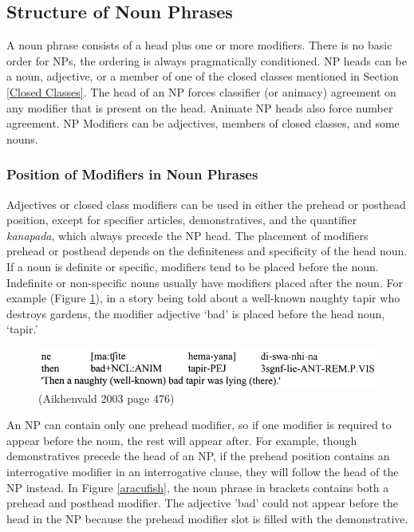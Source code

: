 \documentclass{article}
\begin{document}

\subsection{Structure of Noun Phrases}
A noun phrase consists of a head plus one or more modifiers. There is no basic order for NPs, the ordering is always pragmatically conditioned.
NP heads can be a noun, adjective, or a member of one of the closed classes mentioned in Section \ref*{Closed Classes}. The head of an NP forces classifier (or animacy) agreement on any modifier that is present on the head. Animate NP heads also force number agreement.
NP Modifiers can be adjectives, members of closed classes, and some nouns.

\subsubsection{Position of Modifiers in Noun Phrases}
 Adjectives or closed class modifiers can be used in either the prehead or posthead position, except for specifier articles, demonstratives, and the quantifier \textit{kanapada}, which always precede the NP head. The placement of modifiers prehead or posthead depends on the definiteness and specificity of the head noun. If a noun is definite or specific, modifiers tend to be placed before the noun. Indefinite or non-specific nouns usually have modifiers placed after the noun. For example (Figure \ref*{naughtytapir}), in a story being told about a well-known naughty tapir who destroys gardens, the modifier adjective `bad' is placed before the head noun, `tapir.'

\begin{figure}[h!]
  \centering
  \includegraphics[scale = 0.4]{naughtytapir.png}
    \caption{(Aikhenvald 2003 page 476)}
    \label{naughtytapir}
\end{figure}

\noindent An NP can contain only one prehead modifier, so if one modifier is required to appear before the noun, the rest will appear after. For example, though demonstratives precede the head of an NP, if the prehead position contains an interrogative modifier in an interrogative clause, they will follow the head of the NP instead. In Figure \ref*{aracufish}, the noun phrase in brackets contains both a prehead and posthead modifier. The adjective 'bad' could not appear before the head in the NP because the prehead modifier slot is filled with the demonstrative.
\end{document}
